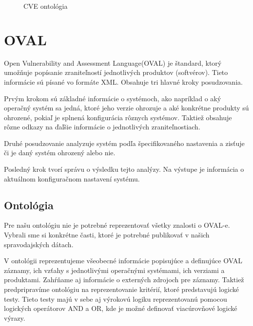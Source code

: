 \documentclass[12pt, a4paper, oneside]{book}
\begin{document}
\begin{figure}
\label{fig:semantic_web}
\caption{CVE ontológia}

\end{figure}



\section{OVAL}
Open Vulnerability and Assessment Language(OVAL) je štandard, ktorý umožňuje popísanie zraniteľností jednotlivých produktov (softvérov). Tieto informácie sú písané vo formáte XML. Obsahuje tri hlavné kroky posudzovania.


Prvým krokom sú základné informácie o systémoch, ako napríklad o aký operačný systém sa jedná, ktoré jeho verzie ohrozuje a aké konkrétne produkty sú ohrozené, pokiaľ je splnená konfigurácia rôznych systémov. Taktiež obsahuje rôzne odkazy na ďaľšie informácie o jednotlivých zraniteľnostiach. 


Druhé posudzovanie analyzuje systém podľa špecifikovaného nastavenia a zisťuje či je daný systém ohrozený alebo nie. 


Posledný krok tvorí správu o výsledku tejto analýzy. Na výstupe je informácia o aktuálnom konfiguračnom nastavení systému.


\subsection{Ontológia}
Pre našu ontológiu nie je potrebné reprezentovať všetky znalosti o OVAL-e. Vybrali sme si konkrétne časti, ktoré je potrebné publikovať v našich spravodajských dátach. 


V ontológii reprezentujeme všeobecné informácie popisujúce a definujúce OVAL záznamy, ich vzťahy s jednotlivými operačnými systémami, ich verziami a produktami. Zahŕňame aj informácie o externých zdrojoch pre záznamy. Taktiež predpripravíme ontológiu na reprezentovanie kritérií, ktoré predstavujú logické testy. Tieto testy majú v sebe aj výrokovú logiku reprezentovanú pomocou logických operátorov AND a OR, kde je možné definovať viacúrovňové logické výrazy.
\end{document}
